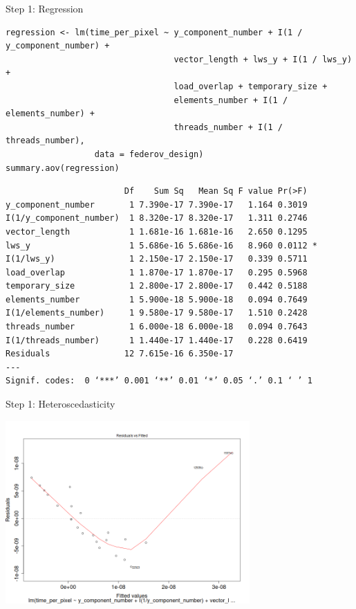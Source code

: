 \documentclass[10pt, compress, aspectratio=169, xcolor={table,usenames,dvipsnames}]{beamer}
\begin{document}
\begin{frame}[fragile,label={sec:orgc74f73e}]{Step 1: Regression}
 \scriptsize
\lstset{language=r,label= ,caption= ,captionpos=b,numbers=none}
\begin{lstlisting}
regression <- lm(time_per_pixel ~ y_component_number + I(1 / y_component_number) +
                                  vector_length + lws_y + I(1 / lws_y) +
                                  load_overlap + temporary_size +
                                  elements_number + I(1 / elements_number) +
                                  threads_number + I(1 / threads_number),
                  data = federov_design)
summary.aov(regression)
\end{lstlisting}

\begin{verbatim}
                        Df    Sum Sq   Mean Sq F value Pr(>F)
y_component_number       1 7.390e-17 7.390e-17   1.164 0.3019
I(1/y_component_number)  1 8.320e-17 8.320e-17   1.311 0.2746
vector_length            1 1.681e-16 1.681e-16   2.650 0.1295
lws_y                    1 5.686e-16 5.686e-16   8.960 0.0112 *
I(1/lws_y)               1 2.150e-17 2.150e-17   0.339 0.5711
load_overlap             1 1.870e-17 1.870e-17   0.295 0.5968
temporary_size           1 2.800e-17 2.800e-17   0.442 0.5188
elements_number          1 5.900e-18 5.900e-18   0.094 0.7649
I(1/elements_number)     1 9.580e-17 9.580e-17   1.510 0.2428
threads_number           1 6.000e-18 6.000e-18   0.094 0.7643
I(1/threads_number)      1 1.440e-17 1.440e-17   0.228 0.6419
Residuals               12 7.615e-16 6.350e-17
---
Signif. codes:  0 ‘***’ 0.001 ‘**’ 0.01 ‘*’ 0.05 ‘.’ 0.1 ‘ ’ 1
\end{verbatim}

\normalsize
\end{frame}

\begin{frame}[label={sec:orgf3350d9}]{Step 1: Heteroscedasticity}
\begin{center}
\includegraphics[width=0.7\textwidth]{../img/regression_before_transform.png}
\end{center}
\end{frame}
\end{document}
